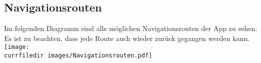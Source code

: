 \begin{samepage}
    \subsection{Navigationsrouten}
    Im folgenden Diagramm sind alle möglichen Navigationsrouten der App zu sehen. 
    Es ist zu beachten, dass jede Route auch wieder zurück gegangen werden kann.\\
    \texttt{[image: \\currfiledir images/Navigationsrouten.pdf]}
    
\end{samepage}